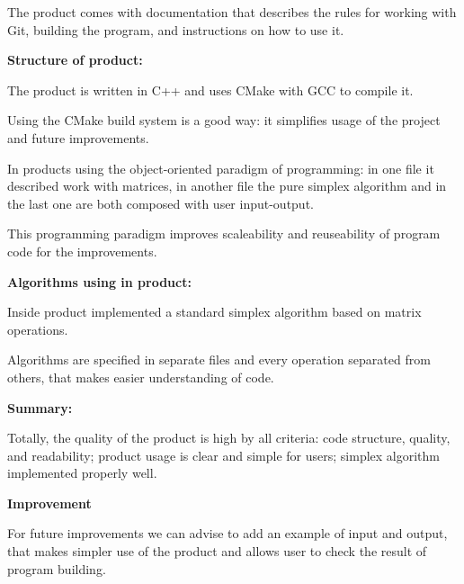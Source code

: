 \documentclass[12pt, legalpaper]{exam}
\begin{document}
The product comes with documentation that describes the rules for working with Git,
building the program, and instructions on how to use it.

\vspace{12pt}
\textbf{Structure of product:}

The product is written in C++ and uses CMake with GCC to compile it.

Using the CMake build system is a good way: it simplifies
usage of the project and future improvements.

\vspace{6pt}

In products using the object-oriented paradigm of programming:
in one file it described work with matrices, in another file
the pure simplex algorithm and in the last one are both composed
with user input-output.

This programming paradigm improves scaleability and
reuseability of program code for the improvements.

\vspace{12pt}
\textbf{Algorithms using in product:}

Inside product implemented a standard simplex algorithm based on matrix operations.

Algorithms are specified in separate files and every operation separated from others,
that makes easier understanding of code.

\vspace{12pt}
\textbf{Summary:}

Totally, the quality of the product is high by all criteria: code structure, quality, and readability;
product usage is clear and simple for users;
simplex algorithm implemented properly well.


\vspace{2cm}
\noindent
{}

\vspace{12pt}
\noindent     \textbf{Improvement}

\vspace{12pt}


For future improvements we can advise to add an example of input and output,
that makes simpler use of the product and allows user to check the result of program building.
\end{document}
